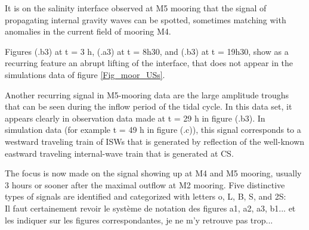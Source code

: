 It is on the salinity interface observed at M5 mooring that the signal of propagating internal gravity waves can be spotted, sometimes matching with anomalies in the current field of mooring M4.

Figures (.b3) at t = 3 h, (.a3) at t = 8h30, and (.b3) at t = 19h30, show as a recurring feature an abrupt lifting of the interface, that does not appear in the simulations data of figure \ref{Fig_moor_USs}.

Another recurring signal in M5-mooring data are the large amplitude troughs that can be seen during the inflow period of the tidal cycle. In this data set, it appears clearly in observation data made at t = 29 h in figure (.b3). In simulation data (for example t = 49 h in figure (.c)), this signal corresponds to a westward traveling train of ISWs that is generated by reflection of the well-known eastward traveling internal-wave train that is generated at CS.

The focus is now made on the signal showing up at M4 and M5 mooring, usually 3 hours or sooner after the maximal outflow at M2 mooring. Five distinctive types of signals are identified and categorized with letters o, L, B, S, and 2S:\\ 
\color{green} Il faut certainement revoir le système de notation des figures a1, a2, a3, b1... et les indiquer sur les figures correspondantes, je ne m'y retrouve pas trop... \color{black}

